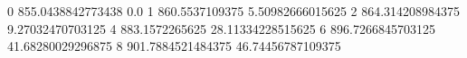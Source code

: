 0 855.0438842773438 0.0
1 860.5537109375 5.50982666015625
2 864.314208984375 9.27032470703125
4 883.1572265625 28.11334228515625
6 896.7266845703125 41.68280029296875
8 901.7884521484375 46.74456787109375
